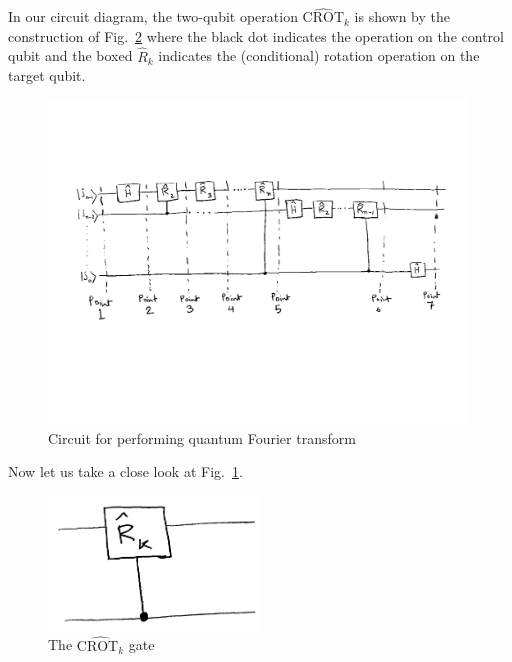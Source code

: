 \documentclass[12pt,oneside]{book}
\begin{document}
In our circuit diagram, the two-qubit operation $\hat{\mathrm{CROT}}_k$ is shown by the construction of Fig.~\ref{Fig.CROT_k} where the black dot indicates the operation on the control qubit and the boxed $\hat{R}_k$ indicates the (conditional) rotation operation on the target qubit.

\begin{figure}
    \centering
\includegraphics[width=0.99\textwidth]{QFT_diagram.pdf}
    \caption{Circuit for performing quantum Fourier transform}
    \label{QFT_circuit}
\end{figure}

Now let us take a close look at Fig.~\ref{QFT_circuit}.

\begin{figure}
    \centering   \includegraphics[width=0.5\textwidth]{CROT_gate.png}
    \caption{The $\hat{\mathrm{CROT}_k}$ gate}
    \label{Fig.CROT_k}
\end{figure}
\end{document}
